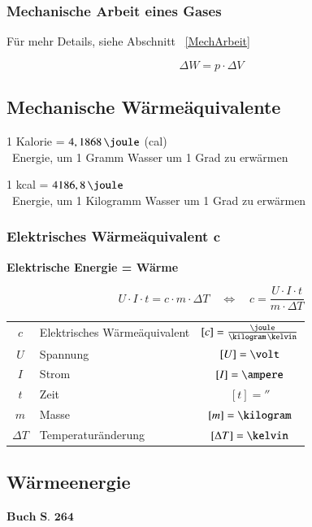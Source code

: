 \subsubsection{Mechanische Arbeit eines Gases}

Für mehr Details, siehe Abschnitt ~\ref{MechArbeit}

$$  \boxed{\Delta W = p \cdot \Delta V } $$


\subsection{Mechanische Wärmeäquivalente}

1 Kalorie = $4,1868 \, \joule$ (cal) \\
\textrightarrow\ Energie, um 1 Gramm Wasser um 1 Grad zu erwärmen

\medskip

1 kcal = $4186,8 \, \joule$ \\
\textrightarrow\ Energie, um 1 Kilogramm Wasser um 1 Grad zu erwärmen


\subsubsection{Elektrisches Wärmeäquivalent $\bm{c}$}

\textbf{Elektrische Energie = Wärme}

$$ \boxed{ U \cdot I \cdot t = c \cdot m \cdot \Delta T \quad \Leftrightarrow \quad c = \frac{U \cdot I \cdot t}{m \cdot \Delta T} } $$


\begin{tabular}{c l c}
	$c$ 		& Elektrisches Wärmeäquivalent	& $[c] = \frac{\joule}{\kilogram \, \kelvin}$		\\
	$U$ 		& Spannung			 			& $[U] = \volt$ 									\\
	$I$ 		& Strom 						& $[I] = \ampere$ 									\\
	$t$ 		& Zeit 							& $[t] = \second$			 						\\
	$m$ 		& Masse 						& $[m] = \kilogram$ 								\\
	$\Delta T$ 	& Temperaturänderung 			& $[\Delta T] = \kelvin$
\end{tabular}


\subsection{Wärmeenergie}
\begin{flushright}
	$\boxed{\textbf{Buch S. 264}}$
\end{flushright}

